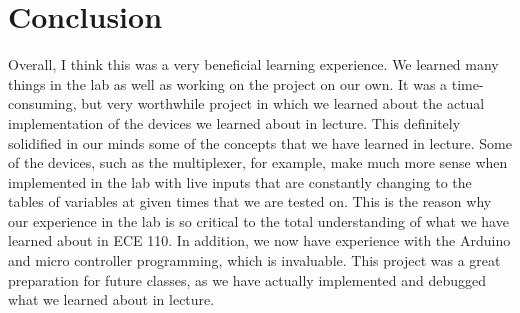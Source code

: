 \documentclass[12pt]{article}
\begin{document}
\section{Conclusion}
Overall, I think this was a very beneficial learning experience. We learned many things in the lab as well as working on the project on our own. It was a time-consuming, but very worthwhile project in which we learned about the actual implementation of the devices we learned about in lecture. This definitely solidified in our minds some of the concepts that we have learned in lecture. Some of the devices, such as the multiplexer, for example, make much more sense when implemented in the lab with live inputs that are constantly changing to the tables of variables at given times that we are tested on. This is the reason why our experience in the lab is so critical to the total understanding of what we have learned about in ECE 110. In addition, we now have experience with the Arduino and micro controller programming, which is invaluable. This project was a great preparation for future classes, as we have actually implemented and debugged what we learned about in lecture.
\end{document}
